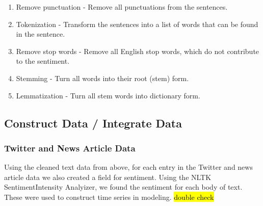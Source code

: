 \documentclass[sigconf, nonacm]{acmart}
\begin{document}
\begin{enumerate}
    \item Remove punctuation - Remove all punctuations from the sentences.
    \item Tokenization - Transform the sentences into a list of words that can be found in the sentence.
    \item Remove stop words - Remove all English stop words, which do not contribute to the sentiment.
    \item Stemming - Turn all words into their root (stem) form.
    \item Lemmatization - Turn all stem words into dictionary form.
\end{enumerate}



\subsection{Construct Data / Integrate Data } 

\subsubsection{Twitter and News Article Data}
Using the cleaned text data from above, for each entry in the Twitter and news article data we also created a field for sentiment. Using the NLTK SentimentIntensity Analyizer, we found the sentiment for each body of text. These were used to construct time series in modeling.
\hl{double check}

\end{document}
